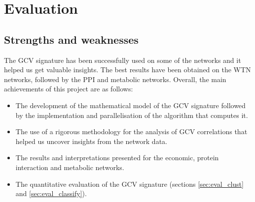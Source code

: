 \chapter{Evaluation}
\label{chp:evaluation}

\section{Strengths and weaknesses}

The GCV signature has been successfully used on some of the networks and it helped us get valuable insights. The best results have been obtained on the WTN networks, followed by the PPI and metabolic networks. Overall, the main achievements of this project are as follows:
\begin{itemize}
 \item The development of the mathematical model of the GCV signature followed by the implementation and parallelisation of the algorithm that computes it.
 \item The use of a rigorous methodology for the analysis of GCV correlations that helped us uncover insights from the network data.
 \item The results and interpretations presented for the economic, protein interaction and metabolic networks.
 \item The quantitative evaluation of the GCV signature (sections \ref{sec:eval_clust} and \ref{sec:eval_classify}).
\end{itemize}

